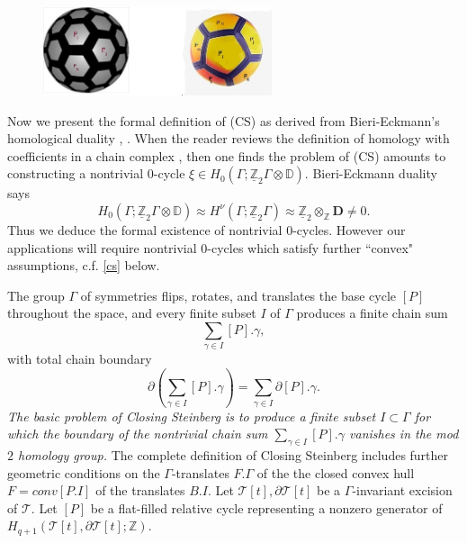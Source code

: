 \documentclass[12pt]{amsart}
\theoremstyle{definition}
\theoremstyle{remark}
\newcommand{\bZ}{\mathbb{Z}}
\newcommand{\del}{\partial}
\newcommand{\bD}{\mathbb{D}}
\newcommand{\sT}{\mathscr{T}}
\begin{document}
\begin{figure}\label{nikeball}
\centering
\includegraphics[width=0.6\textwidth]{ball-nike-pitch.jpg}
\caption{}
\end{figure}

Now we present the formal definition of (CS) as derived from Bieri-Eckmann's homological duality \cite{BiEck}, \cite{BS}. When the reader reviews the definition of homology with coefficients in a chain complex \cite{Brown}, then one finds the problem of (CS) amounts to constructing a nontrivial $0$-cycle $\xi \in H_0(\Gamma; \underline{\bZ}_2 \Gamma \otimes \bD)$. Bieri-Eckmann duality says $$H_0(\Gamma; \underline{\bZ}_2 \Gamma \otimes \bD) \approx H^\nu(\Gamma; \underline{\bZ}_2 \Gamma)\approx \underline{\bZ}_2 \otimes_\bZ \textbf{D}\neq 0.$$ Thus we deduce the formal existence of nontrivial $0$-cycles. However our applications will require nontrivial $0$-cycles which satisfy further ``convex" assumptions, c.f. \eqref{cs} below.

The group $\Gamma$ of symmetries flips, rotates, and translates the base cycle $[P]$ throughout the space, and every finite subset $I$ of $\Gamma$ produces a finite chain sum $$\sum_{\gamma\in I} [P].\gamma,$$ with total chain boundary $$\del(\sum_{\gamma\in I} [P].\gamma)=\sum_{\gamma\in I} \del [P].\gamma.$$ \textit{The basic problem of Closing Steinberg is to produce a finite subset $I \subset \Gamma$ for which the boundary of the nontrivial chain sum $\sum_{\gamma\in I} [P].\gamma$ vanishes in the mod $2$ homology group.} The complete definition of Closing Steinberg includes further geometric conditions on the $\Gamma$-translates $F.\Gamma$ of the the closed convex hull $F=conv[P.I]$ of the translates $B.I$. Let $\sT[t], \del \sT[t]$ be a $\Gamma$-invariant excision of $\sT$. Let $[P]$ be a flat-filled relative cycle representing a nonzero generator of $H_{q+1}(\sT[t], \del \sT[t]; \bZ)$.
\end{document}
